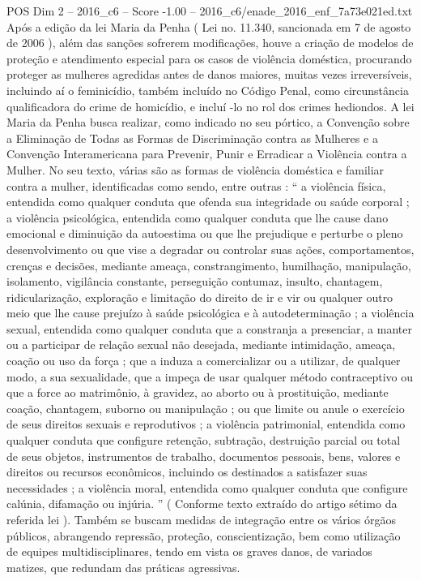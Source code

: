 \begin{textsample}{POS Dim 2 – 2016\_c6 – Score -1.00 – 2016\_c6/enade\_2016\_enf\_7a73e021ed.txt}
Após a edição da lei Maria da Penha ( Lei no. 11.340, sancionada em 7 de agosto de 2006 ), além das sanções sofrerem modificações, houve a criação de modelos de proteção e atendimento especial para os casos de violência doméstica, procurando proteger as mulheres agredidas antes de danos maiores, muitas vezes irreversíveis, incluindo aí o feminicídio, também incluído no Código Penal, como circunstância qualificadora do crime de homicídio, e incluí -lo no rol dos crimes hediondos.
A lei Maria da Penha busca realizar, como indicado no seu pórtico, a Convenção sobre a Eliminação de Todas as Formas de Discriminação contra as Mulheres e a Convenção Interamericana para Prevenir, Punir e Erradicar a Violência contra a Mulher.
No seu texto, várias são as formas de violência doméstica e familiar contra a mulher, identificadas como sendo, entre outras : “ a violência física, entendida como qualquer conduta que ofenda sua integridade ou saúde corporal ; a violência psicológica, entendida como qualquer conduta que lhe cause dano emocional e diminuição da autoestima ou que lhe prejudique e perturbe o pleno desenvolvimento ou que vise a degradar ou controlar suas ações, comportamentos, crenças e decisões, mediante ameaça, constrangimento, humilhação, manipulação, isolamento, vigilância constante, perseguição contumaz, insulto, chantagem, ridicularização, exploração e limitação do direito de ir e vir ou qualquer outro meio que lhe cause prejuízo à saúde psicológica e à autodeterminação ; a violência sexual, entendida como qualquer conduta que a constranja a presenciar, a manter ou a participar de relação sexual não desejada, mediante intimidação, ameaça, coação ou uso da força ; que a induza a comercializar ou a utilizar, de qualquer modo, a sua sexualidade, que a impeça de usar qualquer método contraceptivo ou que a force ao matrimônio, à gravidez, ao aborto ou à prostituição, mediante coação, chantagem, suborno ou manipulação ; ou que limite ou anule o exercício de seus direitos sexuais e reprodutivos ; a violência patrimonial, entendida como qualquer conduta que configure retenção, subtração, destruição parcial ou total de seus objetos, instrumentos de trabalho, documentos pessoais, bens, valores e direitos ou recursos econômicos, incluindo os destinados a satisfazer suas necessidades ; a violência moral, entendida como qualquer conduta que configure calúnia, difamação ou injúria. ” ( Conforme texto extraído do artigo sétimo da referida lei ).
Também se buscam medidas de integração entre os vários órgãos públicos, abrangendo repressão, proteção, conscientização, bem como utilização de equipes multidisciplinares, tendo em vista os graves danos, de variados matizes, que redundam das práticas agressivas.

\end{textsample}

